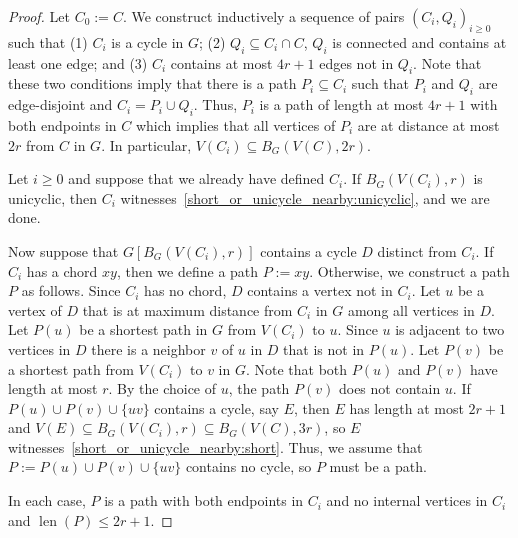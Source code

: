 \documentclass{patmorin}
\DeclareMathOperator{\len}{len}
\begin{document}
\begin{proof}
  Let $C_0:=C$.
  We construct inductively a sequence of pairs $(C_i,Q_i)_{i\geq0}$ such that
  (1) $C_i$ is a cycle in $G$;
  (2) $Q_i\subseteq C_i\cap C$, $Q_i$ is connected and contains at least one edge; and
  (3) $C_i$ contains at most $4r+1$ edges not in $Q_i$.
  Note that these two conditions imply that there is a path $P_i\subseteq C_i$  such that
  $P_i$ and $Q_i$ are edge-disjoint and $C_i=P_i\cup Q_i$.
  Thus, $P_i$ is a path of length at most $4r+1$ with both endpoints in $C$
  which implies that all vertices of $P_i$ are at distance at most $2r$ from $C$ in $G$.
  In particular, $V(C_i)\subseteq B_G(V(C),2r)$.

  Let $i\geq0$ and suppose that we already have defined $C_i$.
  If $B_G(V(C_i),r)$ is unicyclic, then $C_i$ witnesses~\eqref{short_or_unicycle_nearby:unicyclic}, and we are done. 

  Now suppose that $G[B_G(V(C_i),r)]$ contains a cycle $D$ distinct from $C_i$.  If $C_i$ has a chord $xy$, then we define a path $P:=xy$.  Otherwise, we construct a path $P$ as follows. Since $C_i$ has no chord, $D$ contains a vertex not in $C_i$.  Let $u$ be a vertex of $D$ that is at maximum distance from $C_i$ in $G$ among all vertices in $D$.
  Let $P(u)$ be a shortest path in $G$ from $V(C_i)$ to $u$. 
  Since $u$ is adjacent to two vertices in $D$ there is a neighbor $v$ of $u$ in $D$ that is not in $P(u)$.
  Let $P(v)$ be a shortest path from $V(C_i)$ to $v$ in $G$.
  Note that both $P(u)$ and $P(v)$ have length at most $r$.
  By the choice of $u$, the path $P(v)$ does not contain $u$.
  If $P(u)\cup P(v)\cup\{uv\}$ contains a cycle, say $E$, then $E$ has length at most $2r+1$ and $V(E)\subseteq B_G(V(C_i),r)\subseteq B_G(V(C),3r)$, so $E$ witnesses~\eqref{short_or_unicycle_nearby:short}.
  Thus, we assume that $P:=P(u)\cup P(v)\cup\{uv\}$ contains no cycle, so $P$ must be a path.

  In each case, $P$ is a path with both endpoints in $C_i$ and no internal vertices in $C_i$ and $\len(P)\le 2r+1$.


\end{proof}
\end{document}
